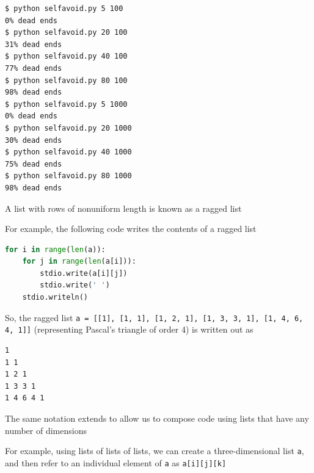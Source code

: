 \documentclass[8pt,a4paper,compress]{beamer}
\begin{document}
\begin{frame}[fragile]
\begin{minipage}{110pt}
\end{minipage}
\end{frame}

\begin{frame}[fragile]
\pause

\begin{lstlisting}[language={}]
$ python selfavoid.py 5 100
0% dead ends
$ python selfavoid.py 20 100
31% dead ends
$ python selfavoid.py 40 100
77% dead ends
$ python selfavoid.py 80 100
98% dead ends
$ python selfavoid.py 5 1000
0% dead ends
$ python selfavoid.py 20 1000
30% dead ends
$ python selfavoid.py 40 1000
75% dead ends
$ python selfavoid.py 80 1000
98% dead ends
\end{lstlisting}
\end{frame}

\begin{frame}[fragile]
\pause

A list with rows of nonuniform length is known as a ragged list

\pause
\bigskip

For example, the following code writes the contents of a ragged list

\begin{lstlisting}[language=Python]
for i in range(len(a)):
    for j in range(len(a[i])):
        stdio.write(a[i][j])
        stdio.write(' ')
    stdio.writeln()
\end{lstlisting}

So, the ragged list \lstinline{a = [[1], [1, 1], [1, 2, 1], [1, 3, 3, 1], [1, 4, 6, 4, 1]]} (representing Pascal's triangle of order 4) is written out as

\begin{lstlisting}[language={}]
1
1 1
1 2 1
1 3 3 1
1 4 6 4 1
\end{lstlisting}

\pause
\bigskip

The same notation extends to allow us to compose code using lists that have any number of dimensions

\pause
\bigskip

For example, using lists of lists of lists, we can create a three-dimensional list \lstinline{a}, and then refer to an individual element of \lstinline{a} as \lstinline{a[i][j][k]}
\end{frame}
\end{document}
